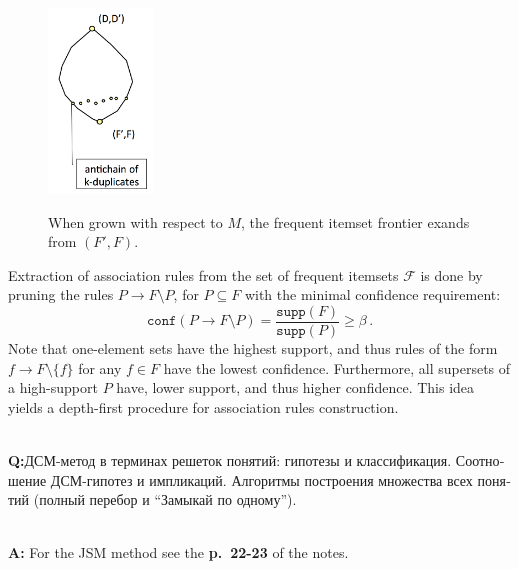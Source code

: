\documentclass[a4paper]{article}
\newcommand{\Fcal}{\mathcal{F}}
\newcommand{\rus}[1]{\foreignlanguage{russian}{#1}}
\begin{document}
\begin{figure}
    \centering
    \includegraphics[width=0.25\textwidth]{assoc_rules_sublattice.png}
    \label{fig:assoc_rules_lattice}
    \caption{When grown with respect to $M$, the frequent itemset frontier
    exands from $(F', F)$.}
\end{figure}

Extraction of association rules from the set of frequent itemsets $\Fcal$ is done by
pruning the rules $P\to F\setminus P$, for $P\subseteq F$ with the minimal confidence
requirement:
$$ \mathtt{conf}(P \to F\setminus P)
    = \frac{\mathtt{supp}(F)}{\mathtt{supp}(P)} \geq \beta
    \,. $$
Note that one-element sets have the highest support, and thus rules of the form 
$f\to F\setminus \{f\}$ for any $f\in F$ have the lowest confidence. Furthermore,
all supersets of a high-support $P$ have, lower support, and thus higher confidence.
This idea yields a depth-first procedure for association rules construction.

\hfill\\\textbf{Q:}\rus{ДСМ-метод в терминах решеток понятий: гипотезы и классификация.
Соотношение ДСМ-гипотез и импликаций. Алгоритмы построения множества всех понятий (полный
перебор и ``Замыкай по одному'').}

\hfill\\\textbf{A:}
\noindent For the JSM method see the \textbf{p.~22-23} of the notes.
\end{document}
